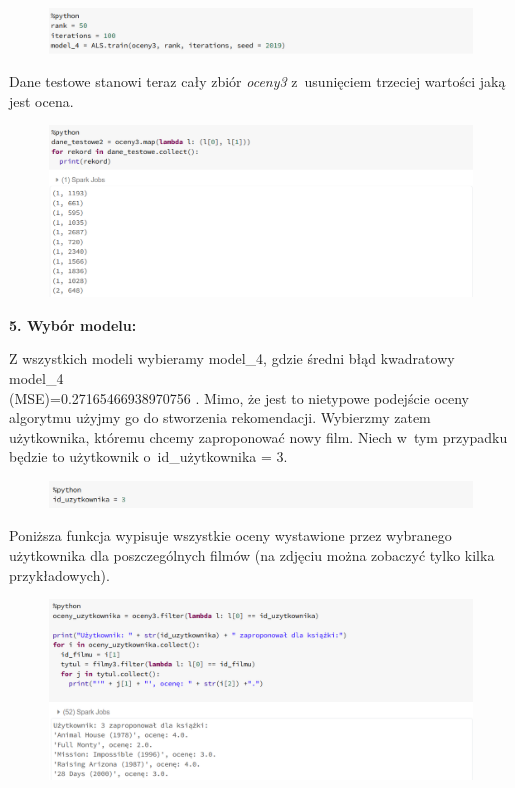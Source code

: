 \documentclass[12pt,a4paper]{report}
\begin{document}
\begin{figure}[H]
\includegraphics[scale=0.5]{obrazy/ALS13.PNG} 
\end{figure}

Dane testowe stanowi teraz cały zbiór \textit{oceny3} z~usunięciem trzeciej wartości jaką jest ocena.

\begin{figure}[H]
\includegraphics[scale=0.5]{obrazy/ALS14.PNG} 
\end{figure}

\textbf{5. Wybór modelu:}

Z wszystkich modeli wybieramy model\_4, gdzie średni błąd kwadratowy model\_4 
\\(MSE)=0.27165466938970756 . Mimo, że jest to nietypowe podejście oceny algorytmu użyjmy go do stworzenia rekomendacji. Wybierzmy zatem użytkownika, któremu chcemy zaproponować nowy film. Niech w~tym przypadku będzie to użytkownik o~id\_użytkownika = 3.

\begin{figure}[H]
\includegraphics[scale=0.5]{obrazy/ALS15.PNG} 
\end{figure}

Poniższa funkcja wypisuje wszystkie oceny wystawione przez wybranego użytkownika dla poszczególnych filmów (na zdjęciu można zobaczyć tylko kilka przykładowych).

\begin{figure}[H]
\includegraphics[scale=0.5]{obrazy/ALS16.PNG} 
\end{figure}
\end{document}
